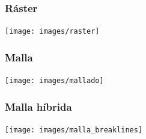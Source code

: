 \begin{frame}
  \frametitle{Ráster}
  \begin{center}
        \texttt{[image: images/raster]}
  \end{center}
\end{frame}
\begin{frame}
  \frametitle{Malla}
  \begin{center}
        \texttt{[image: images/mallado]}
  \end{center}
\end{frame}
\begin{frame}
  \frametitle{Malla híbrida}
  \begin{center}
        \texttt{[image: images/malla\_breaklines]}
  \end{center}
\end{frame}
